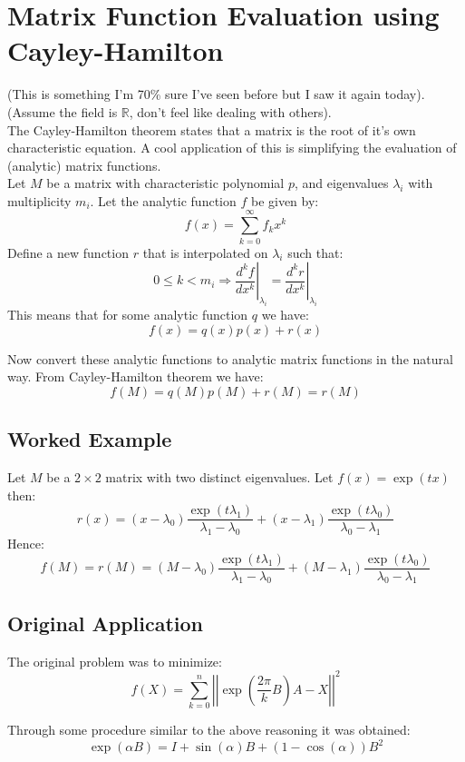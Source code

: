 
\section{Matrix Function Evaluation using Cayley-Hamilton}
(This is something I'm 70\% sure I've seen before but I saw it again today).
(Assume the field is $\mathbb{R}$, don't feel like dealing with others).
\\

The Cayley-Hamilton theorem states that a matrix is the root of it's own characteristic equation.
A cool application of this is simplifying the evaluation of (analytic) matrix functions.
\\

Let $M$ be a matrix with characteristic polynomial $p$,
and eigenvalues $\lambda_i$ with multiplicity $m_i$.
Let the analytic function $f$ be given by:
\[f(x) = \sum_{k=0}^\infty f_kx^k\]
Define a new function $r$ that is interpolated on $\lambda_i$ such that:
\[0\leq k< m_i \Rightarrow\left.\frac{d^k f}{d x^k}\right|_{\lambda_i} =\left.\frac{d^k r}{d x^k}\right|_{\lambda_i}\]
This means that for some analytic function $q$ we have:
\[f(x) = q(x)p(x)+r(x)\]

Now convert these analytic functions to analytic matrix functions in the natural way.
From Cayley-Hamilton theorem we have:
\[f(M) = q(M)p(M)+r(M) = r(M)\]

\subsection{Worked Example}
Let $M$ be a $2\times 2$ matrix with two distinct eigenvalues.
Let $f(x) = \exp(tx)$ then:
\[r(x) = (x-\lambda_0)\frac{\exp(t\lambda_1)}{\lambda_1-\lambda_0}+(x-\lambda_1)\frac{\exp(t\lambda_0)}{\lambda_0-\lambda_1}\]
Hence:
\[f(M) = r(M) =(M-\lambda_0)\frac{\exp(t\lambda_1)}{\lambda_1-\lambda_0}+(M-\lambda_1)\frac{\exp(t\lambda_0)}{\lambda_0-\lambda_1} \]

\subsection{Original Application}
The original problem was to minimize:
\[f(X) = \sum_{k=0}^n\left|\left|\exp\left(\frac{2\pi}{k}B\right)A-X\right|\right|^2\]

Through some procedure similar to the above reasoning it was obtained:
\[\exp(\alpha B) = I+ \sin(\alpha)B+(1-\cos(\alpha))B^2\]

